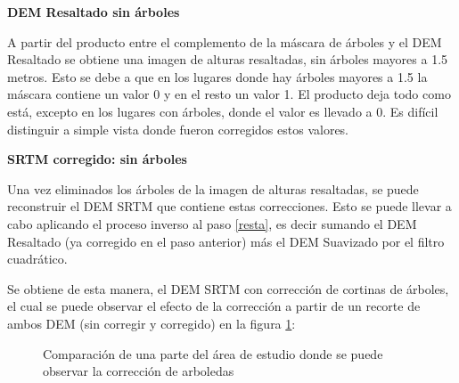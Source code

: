 \documentclass[10pt,a4paper, twoside]{report}
\begin{document}
\textbf{DEM Resaltado sin árboles}

A partir del producto entre el complemento de la máscara de árboles y el DEM Resaltado se obtiene una imagen de alturas resaltadas, sin árboles mayores a 1.5 metros. Esto se debe a que en los lugares donde hay árboles mayores a 1.5 la máscara contiene un valor 0 y en el resto un valor 1. El producto deja todo como está, excepto en los lugares con árboles, donde el valor es llevado a 0. Es difícil distinguir a simple vista donde fueron corregidos estos valores. 


\textbf{SRTM corregido: sin árboles}

Una vez eliminados los árboles de la imagen de alturas resaltadas, se puede reconstruir el DEM SRTM que contiene estas correcciones. Esto se puede llevar a cabo aplicando el proceso inverso al paso \ref{resta}, es decir sumando el DEM Resaltado (ya corregido en el paso anterior) más el DEM Suavizado por el filtro cuadrático.

Se obtiene de esta manera, el DEM SRTM con corrección de cortinas de árboles, el cual se puede observar el efecto de la corrección a partir de un recorte de ambos DEM (sin corregir y corregido) en la figura \ref{fig:comparacionArboledas}:

\begin{figure}[H]
	\centering
	\caption{Comparación de una parte del área de estudio donde se puede observar la corrección de arboledas}
	\label{fig:comparacionArboledas}
\end{figure}
\end{document}
